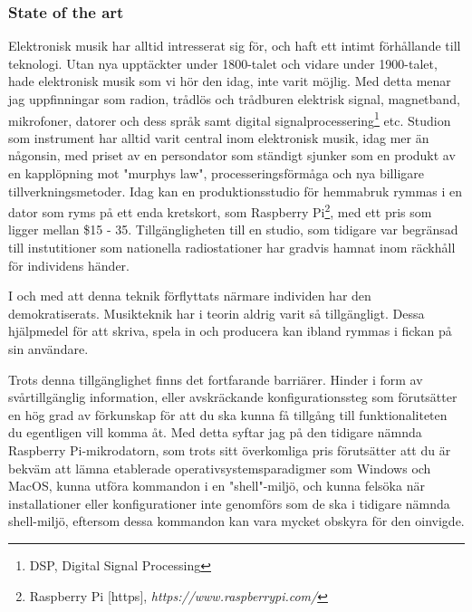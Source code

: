 \documentclass{article}
\begin{document}
\subsubsection{State of the art}

  Elektronisk musik har alltid intresserat sig för, och haft ett intimt förhållande till teknologi. Utan nya
  upptäckter under 1800-talet och vidare under 1900-talet, hade elektronisk musik som vi hör den idag, inte
  varit möjlig. Med detta menar jag uppfinningar som radion, trådlös och trådburen elektrisk signal,
  magnetband, mikrofoner, datorer och dess språk samt digital signalprocessering\footnote{DSP, Digital Signal
  Processing} etc. Studion som instrument har alltid varit central inom elektronisk musik, idag mer än
  någonsin, med priset av en persondator som ständigt sjunker som en produkt av en kapplöpning mot "murphys
  law", processeringsförmåga och nya billigare tillverkningsmetoder. Idag kan en produktionsstudio för
  hemmabruk rymmas i en dator som ryms på ett enda kretskort, som Raspberry Pi\footnote{Raspberry Pi [https],
  \emph{https://www.raspberrypi.com/}}, med ett pris som ligger mellan \$15 - 35. Tillgängligheten till en
  studio, som tidigare var begränsad till instutitioner som nationella radiostationer har gradvis hamnat inom
  räckhåll för individens händer.

  I och med att denna teknik förflyttats närmare individen har den demokratiserats. Musikteknik har i teorin
  aldrig varit så tillgängligt. Dessa hjälpmedel för att skriva, spela in och producera kan ibland rymmas i
  fickan på sin användare.

  Trots denna tillgänglighet finns det fortfarande barriärer. Hinder i form av svårtillgänglig information,
  eller avskräckande konfigurationssteg som förutsätter en hög grad av förkunskap för att du ska kunna få
  tillgång till funktionaliteten du egentligen vill komma åt. Med detta syftar jag på den tidigare nämnda
  Raspberry Pi-mikrodatorn, som trots sitt överkomliga pris förutsätter att du är bekväm att lämna etablerade
  operativsystemsparadigmer som Windows och MacOS, kunna utföra kommandon i en "shell"-miljö, och kunna
  felsöka när installationer eller konfigurationer inte genomförs som de ska i tidigare nämnda shell-miljö,
  eftersom dessa kommandon kan vara mycket obskyra för den oinvigde. 
	
\end{document}
